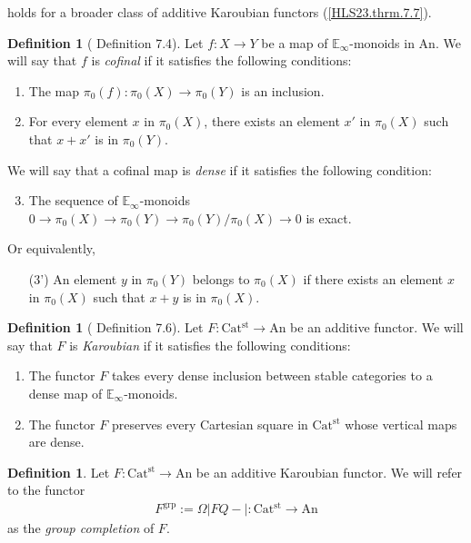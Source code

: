 \documentclass[a4paper,dvipdfmx,11pt,reqno]{amsart}
\DeclareMathOperator{\grp}{grp}
\newcommand{\An}{\mathrm{An}}
\newcommand{\Catst}{\mathrm{Cat^{st}}}
\newcommand{\Einf}{\mathbb{E}_{\infty}}
\theoremstyle{definition}
\newtheorem{definition}[theorem]{Definition}
\begin{document}
 holds for a broader class of additive Karoubian functors (\cref{HLS23.thrm.7.7}).

\begin{definition}[\cite{HLS23} Definition 7.4] \label{HLS23.def.7.4}
  Let $f : X \to Y$ be a map of $\Einf$-monoids in $\An$.
  We will say that $f$ is \textit{cofinal} if it satisfies the following conditions:
  \begin{enumerate}
    \item The map $\pi_0(f) : \pi_0(X) \to \pi_0(Y)$ is an inclusion.
    \item For every element $x$ in $\pi_0(X)$, there exists an element $x'$ in $\pi_0(X)$ such that $x+x'$ is in $\pi_0(Y)$.
  \end{enumerate}
  We will say that a cofinal map is \textit{dense} if it satisfies the following condition:
  \begin{enumerate}[resume]
    \setcounter{enumi}{2}
    \item The sequence of $\Einf$-monoids $0 \to \pi_0(X) \to \pi_0(Y) \to \pi_0(Y)/\pi_0(X) \to 0$ is exact. 
  \end{enumerate}
  Or equivalently, 
  \begin{itemize}
    \item[(3')] An element $y$ in $\pi_0(Y)$ belongs to $\pi_0(X)$ if there exists an element $x$ in $\pi_0(X)$ such that $x+y$ is in $\pi_0(X)$.
  \end{itemize}
\end{definition}

\begin{definition}[\cite{HLS23} Definition 7.6] \label{HLS23.def.7.6}
  Let $F : \Catst \to \An$ be an additive functor.
  We will say that $F$ is \textit{Karoubian} if it satisfies the following conditions:
  \begin{enumerate}
    \item The functor $F$ takes every dense inclusion between stable categories to a dense map of $\Einf$-monoids.
    \item The functor $F$ preserves every Cartesian square in $\Catst$ whose vertical maps are dense.
  \end{enumerate}
\end{definition}

\begin{definition} \label{Ber.p171}
  Let $F : \Catst \to \An$ be an additive Karoubian functor.
  We will refer to the functor
  \begin{align*}
    F^{\grp} := \Omega|FQ-| : \Catst \to \An
  \end{align*}
  as the \textit{group completion} of $F$.
\end{definition}
\end{document}
